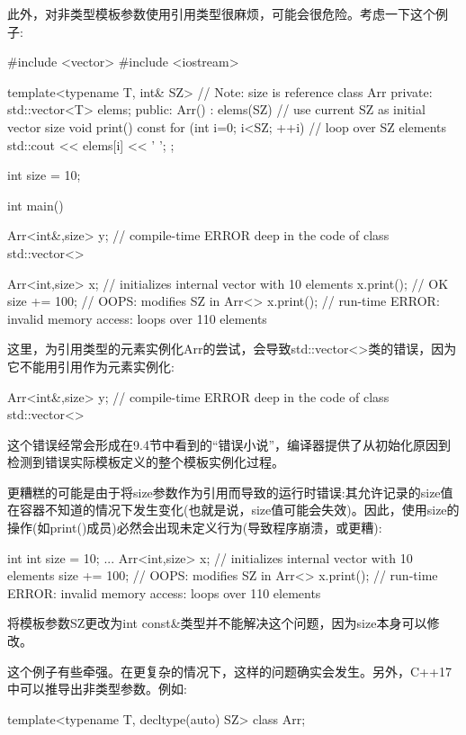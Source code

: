 此外，对非类型模板参数使用引用类型很麻烦，可能会很危险。考虑一下这个例子:

\begin{cpp}
#include <vector>
#include <iostream>

template<typename T, int& SZ> // Note: size is reference
class Arr {
private:
	std::vector<T> elems;
public:
	Arr() : elems(SZ) { // use current SZ as initial vector size
	}
	void print() const {
		for (int i=0; i<SZ; ++i) { // loop over SZ elements
			std::cout << elems[i] << ' ';
		}
	}
};

int size = 10;

int main()
{
	Arr<int&,size> y; // compile-time ERROR deep in the code of class std::vector<>

	Arr<int,size> x; // initializes internal vector with 10 elements
	x.print(); // OK
	size += 100; // OOPS: modifies SZ in Arr<>
	x.print(); // run-time ERROR: invalid memory access: loops over 110 elements
}
\end{cpp}

这里，为引用类型的元素实例化Arr的尝试，会导致std::vector<>类的错误，因为它不能用引用作为元素实例化:

\begin{cpp}
Arr<int&,size> y; // compile-time ERROR deep in the code of class std::vector<>
\end{cpp}

这个错误经常会形成在9.4节中看到的“错误小说”，编译器提供了从初始化原因到检测到错误实际模板定义的整个模板实例化过程。

更糟糕的可能是由于将size参数作为引用而导致的运行时错误:其允许记录的size值在容器不知道的情况下发生变化(也就是说，size值可能会失效)。因此，使用size的操作(如print()成员)必然会出现未定义行为(导致程序崩溃，或更糟):

\begin{cpp}
int int size = 10;
...
Arr<int,size> x; // initializes internal vector with 10 elements
size += 100; // OOPS: modifies SZ in Arr<>
x.print(); // run-time ERROR: invalid memory access: loops over 110 elements
\end{cpp}

将模板参数SZ更改为int const\&类型并不能解决这个问题，因为size本身可以修改。

这个例子有些牵强。在更复杂的情况下，这样的问题确实会发生。另外，C++17中可以推导出非类型参数。例如:

\begin{cpp}
template<typename T, decltype(auto) SZ>
class Arr;
\end{cpp}

